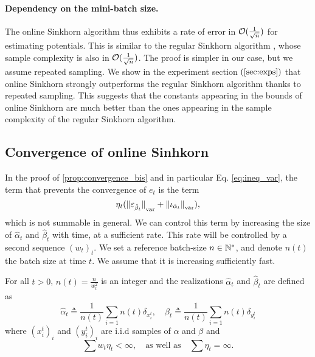 \paragraph{Dependency on the mini-batch size.} The online Sinkhorn algorithm thus
exhibits a rate of error in $\mathcal{O}(\frac{1}{\sqrt{n}})$ for estimating
potentials. This is similar to the regular Sinkhorn algorithm
\citep{2019-Genevay-aistats}, whose sample complexity is also in
$\mathcal{O}(\frac{1}{\sqrt{n}})$. The proof is simpler in our case, but we assume
repeated sampling. We show in the experiment section $(\autoref{sec:exps})$ that
online Sinkhorn strongly outperforms the regular Sinkhorn algorithm thanks to repeated
sampling. This suggests that the constants appearing in the bounds of online
Sinkhorn are much better than the ones appearing in the sample complexity of the regular Sinkhorn algorithm.

\subsection{Convergence of online Sinhkorn}

In the proof of \autoref{prop:convergence_bis} and in particular Eq. \eqref{eq:ineq_var}, the term that prevents the convergence of $e_t$ is the term
\begin{equation}
    \eta_t ({\Vert \varepsilon_{\hat \beta_t} \Vert}_{\text{\upshape var}} + 
    {\Vert \iota_{\hat \alpha_t} \Vert}_{\text{\upshape var}}),
\end{equation}
which is not summable in general. We can control this term by increasing the
 size of $\hat \alpha_t$ and $\hat \beta_t$ with time, at a sufficient rate.
 This rate will be controlled by a second sequence ${(w_t)}_t$. We set a
 reference batch-size $n \in \mathbb{N}^*$, and denote $n(t)$ the batch size at
 time $t$. We assume that it is increasing sufficiently fast.

\begin{assumption}\label{ass:double_weights}
    For all $t > 0$, $n(t) = \frac{n}{w_t^2}$ is an integer and the realizations
    $\hat \alpha_t$ and $\hat \beta_t$ are defined as
    \begin{equation}
         \hat \alpha_t \triangleq \frac{1}{n(t)} \sum_{i=1}{n(t)} \delta_{x_i^t},
         \quad
         \hat \beta_t \triangleq \frac{1}{n(t)} \sum_{i=1}{n(t)} \delta_{y_i^t}
    \end{equation}
where $(x_i^t)_i$ and $(y_i^t)_i$ are i.i.d samples of $\alpha$ and $\beta$ and
\begin{equation}
    \sum w_t \eta_t < \infty,\quad\text{as well as}\quad \sum \eta_t = \infty.
\end{equation}
\end{assumption}

